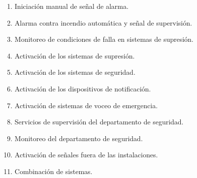 \begin{enumerate}
	
	\item Iniciación manual de señal de alarma.
	
	\item Alarma contra incendio automática y señal de supervisión.
	
	\item Monitoreo de condiciones de falla en sistemas de supresión.
	
	\item Activación de los sistemas de supresión.
	
	\item Activación de los sistemas de seguridad.
	
	\item Activación de los dispositivos de notificación.
	
	\item Activación de sistemas de voceo de emergencia.
	
	\item Servicios de supervisión del departamento de seguridad.
	
	\item Monitoreo del departamento de seguridad.
	
	\item Activación de señales fuera de las instalaciones.
	
	\item Combinación de sistemas.
	
\end{enumerate}





